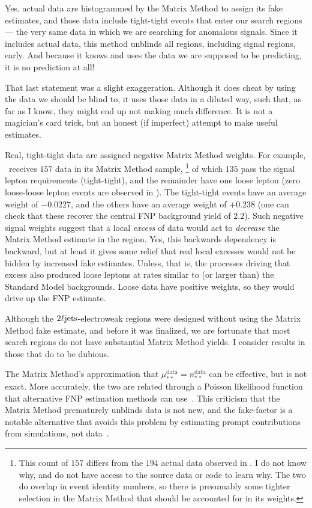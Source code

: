 Yes, actual data are histogrammed by the Matrix Method to assign its fake
estimates, and those data include tight-tight events that enter our search
regions --- the very same data in which we are searching for anomalous signals.
Since it includes actual data, this method unblinds all regions,
including signal regions, early.
And because it knows and uses the data we are supposed to be predicting, it is
no prediction at all!

That last statement was a slight exaggeration.
Although it does cheat by using the data we should be blind to, it uses those
data in a diluted way, such that, as far as I know, they might end up not
making much difference.
It is not a magician's card trick, but an honest (if imperfect) attempt to make
useful estimates.

Real, tight-tight data are assigned negative Matrix Method weights.
For example, \crvz\ receives $157$ data in its Matrix Method sample,%
\footnote{%
This count of $157$ differs from the $194$ actual data observed in \crvz.
I do not know why, and do not have access to the source data or code to
learn why.
The two do overlap in event identity numbers, so there is presumably some
tighter selection in the Matrix Method that should be accounted for in its
weights.
}
of which $135$ pass the signal lepton requirements (tight-tight),
and the remainder have one loose lepton (zero loose-loose lepton events
are observed in \crvz).
The tight-tight events have an average weight of $-0.0227$, and the others
have an average weight of $+0.238$ (one can check that these recover the
central FNP background yield of $2.2$).
Such negative signal weights suggest that a local \emph{excess} of data
would act to \emph{decrease} the Matrix Method estimate in the region.
Yes, this backwards dependency is backward, but at least it gives some relief
that real local excesses would not be hidden by increased fake estimates.
Unless, that is, the processes driving that excess also produced loose leptons
at rates similar to (or larger than) the Standard Model backgrounds.
Loose data have positive weights, so they would drive up the FNP estimate.

Although the $2\ell\mathrm{jets}$-electroweak regions were designed without using the
Matrix Method fake estimate, and before it was finalized, we are fortunate that
most search regions do not have substantial Matrix Method yields.
I consider results in those that do to be dubious.

The Matrix Method's approximation that
$\mu^\textrm{data}_{**} = n^\textrm{data}_{**}$ can be effective, but is not
exact.
More accurately, the two are related through a Poisson likelihood function
that alternative FNP estimation methods can use~\cite{
Erdmann:2021pqi,
Gillam:2014xua
}.
This criticism that the Matrix Method prematurely unblinds data is not new, and
the fake-factor is a notable alternative that avoids this problem by estimating
prompt contributions from simulations, not data~\cite{
Alison2015,
ATLAS:2017ztq
}.

